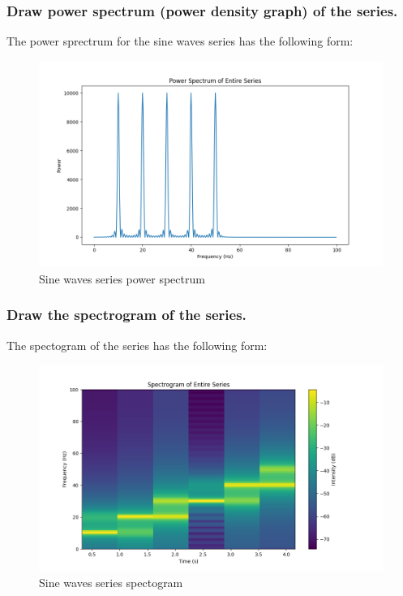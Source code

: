 \documentclass{article}
\begin{document}
\subsubsection{Draw power spectrum (power density graph) of the series.}
The power sprectrum for the sine waves series has the following form:
    \begin{figure}[H]
    \centering \includegraphics[width=0.6\linewidth]{img/stacked_sin/sines_powerspectrum.png}
    \caption{Sine waves series power spectrum}
    \label{fig:sine_waves_power_spectrum}
    \end{figure}
\subsubsection{Draw the spectrogram of the series.}
The spectogram of the series has the following form:
 \begin{figure}[H]
    \centering \includegraphics[width=0.6\linewidth]{img/stacked_sin/sines_spectrogram.png}
    \caption{Sine waves series spectogram}
    \label{fig:sine_waves_spectogram}
    \end{figure}
\end{document}
